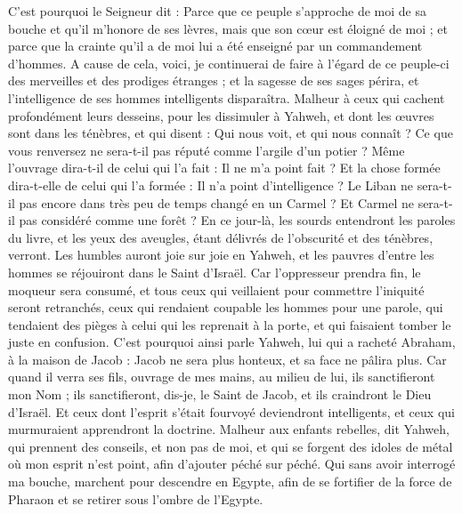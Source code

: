 \begin{multicols}{2}
C'est pourquoi le Seigneur dit : Parce que ce peuple s'approche de moi de sa bouche et qu'il m'honore de ses lèvres, mais que son cœur est éloigné de moi ; et parce que la crainte qu'il a de moi lui a été enseigné par un commandement d'hommes.
A cause de cela, voici, je continuerai de faire à l'égard de ce peuple-ci des merveilles et des prodiges étranges ; et la sagesse de ses sages périra, et l'intelligence de ses hommes intelligents disparaîtra.
Malheur à ceux qui cachent profondément leurs desseins, pour les dissimuler à Yahweh, et dont les œuvres sont dans les ténèbres, et qui disent : Qui nous voit, et qui nous connaît ?
Ce que vous renversez ne sera-t-il pas réputé comme l'argile d'un potier ? Même l'ouvrage dira-t-il de celui qui l'a fait : Il ne m'a point fait ? Et la chose formée dira-t-elle de celui qui l'a formée : Il n'a point d'intelligence ?
Le Liban ne sera-t-il pas encore dans très peu de temps changé en un Carmel ? Et Carmel ne sera-t-il pas considéré comme une forêt ?
En ce jour-là, les sourds entendront les paroles du livre, et les yeux des aveugles, étant délivrés de l'obscurité et des ténèbres, verront.
Les humbles auront joie sur joie en Yahweh, et les pauvres d'entre les hommes se réjouiront dans le Saint d'Israël.
Car l'oppresseur prendra fin, le moqueur sera consumé, et tous ceux qui veillaient pour commettre l'iniquité seront retranchés,
ceux qui rendaient coupable les hommes pour une parole, qui tendaient des pièges à celui qui les reprenait à la porte, et qui faisaient tomber le juste en confusion. 
C'est pourquoi ainsi parle Yahweh, lui qui a racheté Abraham, à la maison de Jacob : Jacob ne sera plus honteux, et sa face ne pâlira plus.
Car quand il verra ses fils, ouvrage de mes mains, au milieu de lui, ils sanctifieront mon Nom ; ils sanctifieront, dis-je, le Saint de Jacob, et ils craindront le Dieu d'Israël.
Et ceux dont l'esprit s'était fourvoyé deviendront intelligents, et ceux qui murmuraient apprendront la doctrine.
\VerseOne{}Malheur aux enfants rebelles, dit Yahweh, qui prennent des conseils, et non pas de moi, et qui se forgent des idoles de métal où mon esprit n'est point, afin d'ajouter péché sur péché.
Qui sans avoir interrogé ma bouche, marchent pour descendre en Egypte, afin de se fortifier de la force de Pharaon et se retirer sous l'ombre de l'Egypte.

\end{multicols}
